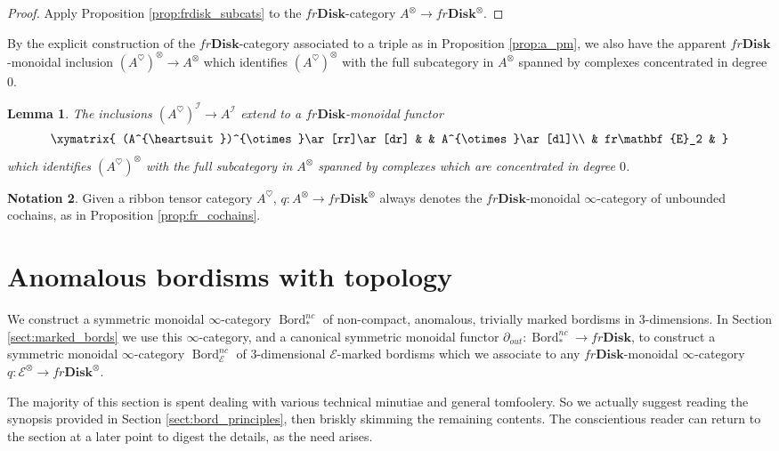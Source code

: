\documentclass[reqno]{amsart}
\newtheorem{lemma}{Lemma}[section]
\theoremstyle{definition}
\newtheorem{notation}[lemma]{Notation}
\newcommand{\mcl}[1]{\mathcal{#1}}
\newcommand{\msc}[1]{\mathscr{#1}}
\newcommand{\ot}{\otimes}
\newcommand{\E}{\mathbf{E}}
\newcommand{\Disk}{\mathbf{Disk}}
\DeclareMathOperator{\Bord}{Bord}
\renewcommand{\1}{\mathbf{1}}
\begin{document}
\begin{proof}
Apply Proposition \ref{prop:frdisk_subcats} to the $fr\Disk$-category $A^{\ot}\to fr\Disk^{\ot}$.
\end{proof}

By the explicit construction of the $fr\Disk$-category associated to a triple as in Proposition \ref{prop:a_pm}, we also have the apparent $fr\Disk$-monoidal inclusion $(A^{\heartsuit})^{\ot}\to A^{\ot}$ which identifies $(A^{\heartsuit})^{\ot}$ with the full subcategory in $A^{\ot}$ spanned by complexes concentrated in degree $0$.

\begin{lemma}
The inclusions $(A^{\heartsuit})^{\mcl{I}}\to A^{\mcl{I}}$ extend to a $fr\Disk$-monoidal functor
\[
\xymatrix{
(A^{\heartsuit})^{\ot}\ar[rr]\ar[dr] & & A^{\ot}\ar[dl]\\
	& fr\E_2 & 
}
\]
which identifies $(A^{\heartsuit})^{\ot}$ with the full subcategory in $A^{\ot}$ spanned by complexes which are concentrated in degree $0$.
\end{lemma}

\begin{notation}
Given a ribbon tensor category $A^{\heartsuit}$, $q:A^{\ot}\to fr\Disk^{\ot}$ always denotes the $fr\Disk$-monoidal $\infty$-category of unbounded cochains, as in Proposition \ref{prop:fr_cochains}.
\end{notation}


\section{Anomalous bordisms with topology}
\label{sect:bord_star}

We construct a symmetric monoidal $\infty$-category $\Bord_{\ast}^{nc}$ of non-compact, anomalous, trivially marked bordisms in $3$-dimensions.  In Section \ref{sect:marked_bords} we use this $\infty$-category, and a canonical symmetric monoidal functor $\partial_{out}:\Bord_{\ast}^{nc}\to fr\Disk$, to construct a symmetric monoidal $\infty$-category $\Bord^{nc}_{\msc{E}}$ of $3$-dimensional $\msc{E}$-marked bordisms which we associate to any $fr\Disk$-monoidal $\infty$-category $q:\msc{E}^{\ot}\to fr\Disk^{\ot}$.
\par

The majority of this section is spent dealing with various technical minutiae and general tomfoolery.  So we actually suggest reading the synopsis provided in Section \ref{sect:bord_principles}, then briskly skimming the remaining contents. The conscientious reader can return to the section at a later point to digest the details, as the need arises.
\end{document}
